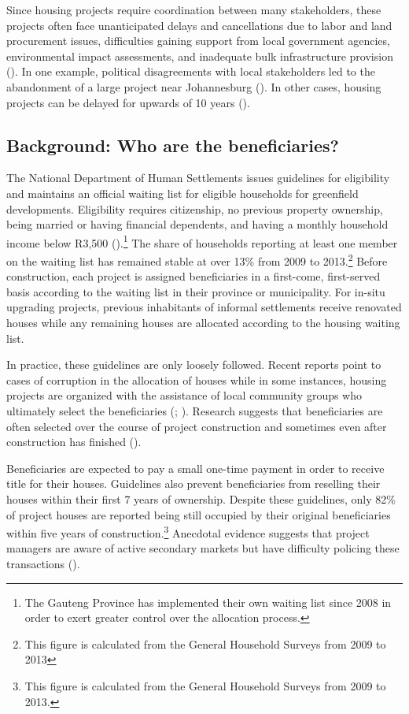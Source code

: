 \documentclass[12pt]{article}
\begin{document}
Since housing projects require coordination between many stakeholders, these projects often face unanticipated delays and cancellations due to labor and land procurement issues, difficulties gaining support from local government agencies, environmental impact assessments, and inadequate bulk infrastructure provision (\cite{dhsreports}).  In one example, political disagreements with local stakeholders led to the abandonment of a large project near Johannesburg (\cite{protest}).  In other cases, housing projects can be delayed for upwards of 10 years (\cite{dagpl}). 


\subsection{Background: Who are the beneficiaries?}

The National Department of Human Settlements issues guidelines for eligibility and maintains an official waiting list for eligible households for greenfield developments.  Eligibility requires citizenship, no previous property ownership, being married or having financial dependents, and having a monthly household income below R3,500 (\cite{seriq}).\footnote{The Gauteng Province has implemented their own waiting list since 2008 in order to exert greater control over the allocation process.}  The share of households reporting at least one member on the waiting list has remained stable at over 13\% from 2009 to 2013.\footnote{This figure is calculated from the General Household Surveys from 2009 to 2013}  Before construction, each project is assigned beneficiaries in a first-come, first-served basis according to the waiting list in their province or municipality.  For in-situ upgrading projects, previous inhabitants of informal settlements receive renovated houses while any remaining houses are allocated according to the housing waiting list.

In practice, these guidelines are only loosely followed.  Recent reports point to cases of corruption in the allocation of houses while in some instances, housing projects are organized with the assistance of local community groups who ultimately select the beneficiaries (\cite{seriq}; \cite{casestudytinazonke}).  Research suggests that beneficiaries are often selected over the course of project construction and sometimes even after construction has finished (\cite{seriq}).

Beneficiaries are expected to pay a small one-time payment in order to receive title for their houses.  Guidelines also prevent beneficiaries from reselling their houses within their first 7 years of ownership.  Despite these guidelines, only 82\% of project houses are reported being still occupied by their original beneficiaries within five years of construction.\footnote{This figure is calculated from the General Household Surveys from 2009 to 2013.}  Anecdotal evidence suggests that project managers are aware of active secondary markets but have difficulty policing these transactions (\cite{resale}).
\end{document}
